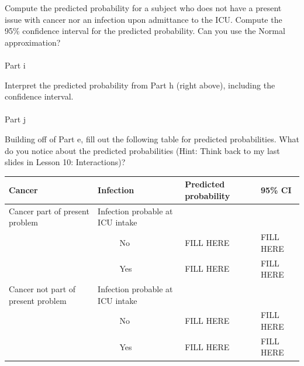 \documentclass[
  letterpaper,
  DIV=11,
  numbers=noendperiod]{scrartcl}
\makeatletter
\let\oldparagraph\paragraph
\renewcommand{\paragraph}{
    \@ifstar
      \xxxParagraphStar
      \xxxParagraphNoStar
  }
\newcommand{\xxxParagraphStar}[1]{\oldparagraph*{#1}\mbox{}}
\newcommand{\xxxParagraphNoStar}[1]{\oldparagraph{#1}\mbox{}}
\makeatother
\begin{document}
Compute the predicted probability for a subject who does not have a
present issue with cancer nor an infection upon admittance to the ICU.
Compute the 95\% confidence interval for the predicted probability. Can
you use the Normal approximation?

\paragraph{Part i}\label{part-i}

Interpret the predicted probability from Part h (right above), including
the confidence interval.

\paragraph{Part j}\label{part-j}

Building off of Part e, fill out the following table for predicted
probabilities. What do you notice about the predicted probabilities
(Hint: Think back to my last slides in Lesson 10: Interactions)?

\begin{longtable}[]{@{}
  >{\raggedright\arraybackslash}p{}
  >{\raggedright\arraybackslash}p{}
  >{\raggedright\arraybackslash}p{}
  >{\raggedright\arraybackslash}p{}@{}}
\toprule\noalign{}
\begin{minipage}[b]{\linewidth}\raggedright
Cancer
\end{minipage} & \begin{minipage}[b]{\linewidth}\raggedright
Infection
\end{minipage} & \begin{minipage}[b]{\linewidth}\raggedright
Predicted probability
\end{minipage} & \begin{minipage}[b]{\linewidth}\raggedright
95\% CI
\end{minipage} \\
\midrule\noalign{}
\endhead
\bottomrule\noalign{}
\endlastfoot
Cancer part of present problem & Infection probable at ICU intake & & \\
& ~ ~ ~~No & FILL HERE & FILL HERE \\
& ~ ~ ~~Yes & FILL HERE & FILL HERE \\
Cancer not part of present problem & Infection probable at ICU intake &
& \\
& ~ ~ ~~No & FILL HERE & FILL HERE \\
& ~ ~ ~~Yes & FILL HERE & FILL HERE \\
\end{longtable}
\end{document}
